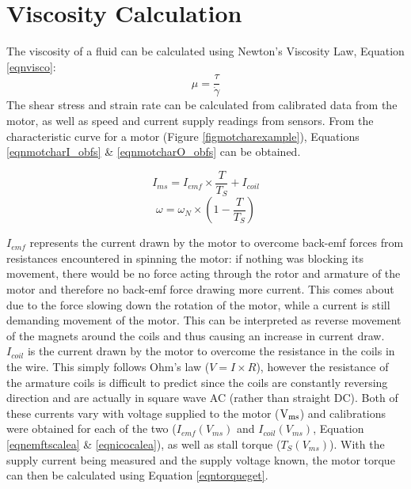 \documentclass[twoside,a4]{report}
\def\br{\newline \newline \noindent}
\begin{document}
	
	\section{Viscosity Calculation}
	The viscosity of a fluid can be calculated using Newton's Viscosity Law, Equation \ref{eqnvisco}:
	\[\mu = \frac{\tau}{\dot{\gamma}}\]
	\newline
	The shear stress and strain rate can be calculated from calibrated data from the motor, as well as speed and current supply readings from sensors. From the characteristic curve for a motor (Figure \ref{figmotcharexample}), Equations \ref{eqnmotcharI_obfs} \& \ref{eqnmotcharO_obfs} can be obtained. 
	
	\begin{equation}
		I_{ms} = I_{emf} \times \frac{T}{T_S} + I_{coil}
		\label{eqnmotcharI_obfs}
	\end{equation}
	\begin{equation}
		\omega = \omega_N \times \left(1 - \frac{T}{T_S}\right)
		\label{eqnmotcharO_obfs}
	\end{equation}
	
	\noindent
	$I_{emf}$ represents the current drawn by the motor to overcome back-emf forces from resistances encountered in spinning the motor: if nothing was blocking its movement, there would be no force acting through the rotor and armature of the motor and therefore no back-emf force drawing more current. This comes about due to the force slowing down the rotation of the motor, while a current is still demanding movement of the motor. This can be interpreted as reverse movement of the magnets around the coils and thus causing an increase in current draw. $I_{coil}$ is the current drawn by the motor to overcome the resistance in the coils in the wire. This simply follows Ohm's law (\(V=I\times R\)), however the resistance of the armature coils is difficult to predict since the coils are constantly reversing direction and are actually in square wave AC (rather than straight DC). 
	\br
	Both of these currents vary with voltage supplied to the motor ($\rm V_{ms}$) and calibrations were obtained for each of the two ($I_{emf} (V_{ms})$ and $I_{coil} (V_{ms})$, Equation \ref{eqnemftscalea} \& \ref{eqnicocalea}), as well as stall torque ($T_S (V_{ms})$). With the supply current being measured and the supply voltage known, the motor torque can then be calculated using Equation \ref{eqntorqueget}.
\end{document}
